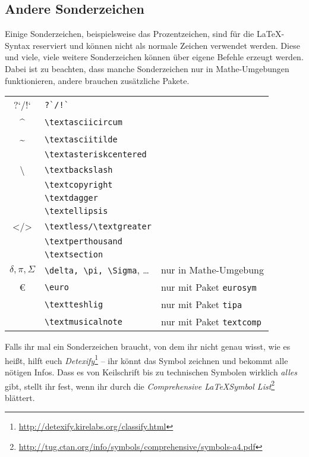 \subsection{Andere Sonderzeichen}
Einige Sonderzeichen, beispielsweise das Prozentzeichen, sind für die \LaTeX{}-Syntax reserviert und können nicht als normale Zeichen verwendet werden.
Diese und viele, viele weitere Sonderzeichen können über eigene Befehle erzeugt werden.
Dabei ist zu beachten, dass manche Sonderzeichen nur in Mathe-Umgebungen funktionieren, andere brauchen zusätzliche Pakete.
\begin{center}
	\begin{longtable}{cll}
		\toprule
			?`/!` & \verb|?`/!`| & \\
			\textasciicircum & \verb|\textasciicircum| & \\
			\textasciitilde & \verb|\textasciitilde| & \\
			\textasteriskcentered & \verb|\textasteriskcentered| & \\
			\textbackslash & \verb|\textbackslash| & \\
			\textcopyright & \verb|\textcopyright| & \\
			\textdagger & \verb|\textdagger| & \\
			\textellipsis & \verb|\textellipsis| & \\
			\textless/\textgreater & \verb|\textless/\textgreater| & \\
			\textperthousand & \verb|\textperthousand| & \\
			\textsection & \verb|\textsection| & \\
			$\delta, \pi, \Sigma$ & \verb|\delta, \pi, \Sigma|, … & nur in Mathe-Umgebung \\
			\euro & \verb|\euro| & nur mit Paket \texttt{eurosym} \\
			\textteshlig & \verb|\textteshlig| & nur mit Paket \texttt{tipa} \\
			\textmusicalnote & \verb|\textmusicalnote| & nur mit Paket \texttt{textcomp} \\
		\bottomrule
	\end{longtable}
\end{center}
Falls ihr mal ein Sonderzeichen braucht, von dem ihr nicht genau wisst, wie es heißt, hilft euch \emph{Detexify}\footnote{\url{http://detexify.kirelabs.org/classify.html}} – ihr könnt das Symbol zeichnen und bekommt alle nötigen Infos.
Dass es von Keilschrift bis zu technischen Symbolen wirklich \emph{alles} gibt, stellt ihr fest, wenn ihr durch die \emph{Comprehensive \LaTeX Symbol List}\footnote{\url{http://tug.ctan.org/info/symbols/comprehensive/symbols-a4.pdf}} blättert.


